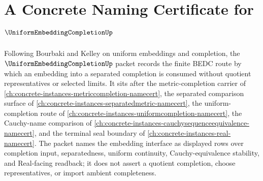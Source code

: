 \chapter{A Concrete Naming Certificate for $\UniformEmbeddingCompletionUp$}
\label{ch:concrete-instances-uniform-embedding-completion-namecert}

Following Bourbaki and Kelley on uniform embeddings and completion, the $\UniformEmbeddingCompletionUp$ packet records the finite BEDC route by which an embedding into a separated completion is consumed without quotient representatives or selected limits. It sits after the metric-completion carrier of \autoref{ch:concrete-instances-metriccompletion-namecert}, the separated comparison surface of \autoref{ch:concrete-instances-separatedmetric-namecert}, the uniform-completion route of \autoref{ch:concrete-instances-uniformcompletion-namecert}, the Cauchy-name comparison of \autoref{ch:concrete-instances-cauchysequenceequivalence-namecert}, and the terminal seal boundary of \autoref{ch:concrete-instances-real-namecert}. The packet names the embedding interface as displayed rows over completion input, separatedness, uniform continuity, Cauchy-equivalence stability, and Real-facing readback; it does not assert a quotient completion, choose representatives, or import ambient completeness.

